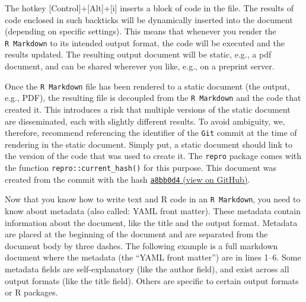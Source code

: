 \documentclass[psych,tutorial,submit,moreauthors,pdftex]{mdpi}
\begin{document}
The hotkey {[}Control{]}+{[}Alt{]}+{[}i{]} inserts a block of code in
the file. The results of code enclosed in such backticks will be
dynamically inserted into the document (depending on specific settings).
This means that whenever you render the \texttt{R\ Markdown} to its
intended output format, the code will be executed and the results
updated. The resulting output document will be static, e.g., a pdf
document, and can be shared wherever you like, e.g., on a preprint
server.

Once the \texttt{R\ Markdown} file has been rendered to a static
document (the output, e.g., PDF), the resulting file is decoupled from
the \texttt{R\ Markdown} and the code that created it. This introduces a
risk that multiple versions of the static document are disseminated,
each with slightly different results. To avoid ambiguity, we, therefore,
recommend referencing the identifier of the \texttt{Git} commit at the
time of rendering in the static document. Simply put, a static document
should link to the version of the code that was used to create it. The
\texttt{repro} package comes with the function
\texttt{repro::current\_hash()} for this purpose. This document was
created from the commit with the hash
\href{https://github.com/aaronpeikert/repro-tutorial/tree/a8bb0d4df4afa4f7dbb5cd2344ae16043cb8a99d}{\texttt{a8bb0d4}
(view on GitHub)}.

Now that you know how to write text and R code in an
\texttt{R\ Markdown}, you need to know about metadata (also called: YAML
front matter). These metadata contain information about the document,
like the title and the output format. Metadata are placed at the
beginning of the document and are separated from the document body by
three dashes. The following example is a full markdown document where
the metadata (the ``YAML front matter'') are in lines 1--6. Some
metadata fields are self-explanatory (like the author field), and exist
across all output formats (like the title field). Others are specific to
certain output formats or R packages.
\end{document}
